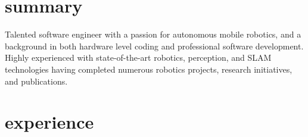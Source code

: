 \documentclass[stdletter]{friggeri-cv} %
\begin{document}
%    
%    

\section{summary}
\vspace{-0.1cm}
Talented software engineer with a passion for autonomous mobile robotics, and a background in both hardware level coding and professional software development. Highly experienced with state-of-the-art robotics, perception, and SLAM technologies having completed numerous robotics projects, research initiatives, and publications.
\vspace{-0.2cm}


\section{experience}
\end{document}
